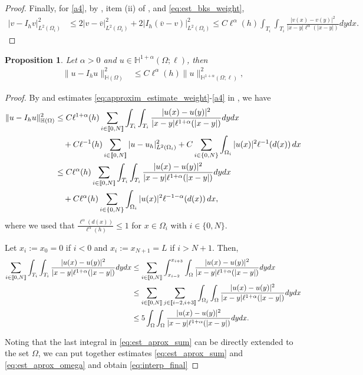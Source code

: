 \documentclass[10 pt]{article}
\newcommand\inter[1]{\llbracket #1\rrbracket}
\newtheorem{proposition}[theorem]{Proposition}
\numberwithin{equation}{section}
\newcommand{\weH}[1]{\mathbb H^{#1}(\Omega;\ell)}
\newcommand{\B}[1]{{\color{red} #1}}  %
\begin{document}
\begin{proof}
Finally, for \eqref{a4}, by , item (ii) of , and \eqref{eq:est_bks_weight}, 
\begin{align*}
    |v-I_h v|_{L^2(\Omega_i)}^2&\leq 2|v-\overline{v}|_{L^2(\Omega_i)}^2+2|I_h(\overline{v}-v)|_{L^2(\Omega_i)}^2\leq C\ell^{\alpha}(h)\int_{T_{i}}\int_{T_{i}}\frac{|v(x)-v(y)|^2}{|x-y|\ell^{\alpha}(|x-y|)}dy dx.
\end{align*}
\end{proof}


\begin{proposition}\label{prop:est_interpolator}
Let $\alpha>0$ and $u\in\weH{1+\alpha}$, then
\begin{align}\label{eq:interp_final}
    \|u-I_hu\|^2_{\mathbb H(\Omega)}&\leq C\ell^{\alpha}(h) \|u\|^2_{\weH{1+\alpha}},
\end{align}
\end{proposition}
\begin{proof}
By  and estimates \eqref{eq:approxim_estimate_weight}-\eqref{a4} in , we have
%
\begin{align}
    \|u-I_h u\|^2_{\mathbb H(\Omega)}&\leq C \ell^{1+\alpha}(h)\sum_{i\in\inter{0,N}}\int_{T_i}\int_{T_i}\frac{|u(x)-u(y)|^2}{|x-y|\ell^{1+\alpha}(|x-y|)}dy dx\notag\\
    &\quad +C\ell^{-1}(h)\sum_{i\in\inter{0,N}}|u-u_h|_{L^2(\Omega_i)}^2+C\sum_{i\in\{0,N\}}\int_{\Omega_i}|u(x)|^2\ell^{-1}(d(x))\,dx\notag\\
    &\leq C \ell^{\alpha}(h)\sum_{i\in\inter{0,N}}\int_{T_i}\int_{T_i}\frac{|u(x)-u(y)|^2}{|x-y|\ell^{1+\alpha}(|x-y|)}dy dx\notag\\ 
    &\quad +C\ell^{\alpha}(h)\sum_{i\in\{0,N\}}\int_{\Omega_i}|u(x)|^2\ell^{-1-\alpha}(d(x))\,dx,\label{eq:est_aprox_sum}
\end{align}
where we used that $\frac{\ell^{\alpha}(d(x))}{\ell^{\alpha}(h)}\leq 1$ for $x\in\Omega_i$ with \B{$i\in\{0,N\}$}.  

Let $x_i:=x_0=0$ if $i<0$ and $x_i:=x_{N+1}=L$ if $i>N+1$.  Then, 
%
\begin{align}\notag
   \sum_{i\in\inter{0,N}} \int_{T_i}\int_{T_i}\frac{|u(x)-u(y)|^2}{|x-y|\ell^{1+\alpha}(|x-y|)}dy dx 
   &\leq \sum_{i\in\inter{0,N}} \int_{x_{i-2}}^{x_{i+3}}\int_{\Omega}\frac{|u(x)-u(y)|^2}{|x-y|\ell^{1+\alpha}(|x-y|)}dy dx\notag\\
   &\leq \sum_{i\in\inter{0,N}} \sum_{j\in \inter{i-2,i+3}}\int_{\Omega_j}\int_{\Omega}\frac{|u(x)-u(y)|^2}{|x-y|\ell^{1+\alpha}(|x-y|)}dy dx\notag\\
 & \leq 5\int_{\Omega}\int_{\Omega} \frac{|u(x)-u(y)|^2}{|x-y|\ell^{1+\alpha}(|x-y|)}dy dx. \label{eq:est_aprox_omega}
\end{align}

Noting that the last integral in \eqref{eq:est_aprox_sum} can be directly extended to the set $\Omega$, we can put together estimates \eqref{eq:est_aprox_sum} and \eqref{eq:est_aprox_omega} and obtain \eqref{eq:interp_final}
\end{proof}
%
\end{document}
